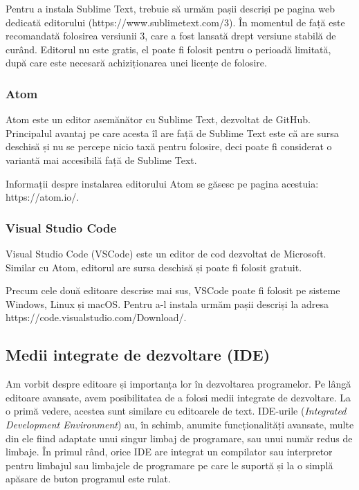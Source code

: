 Pentru a instala Sublime Text, trebuie să urmăm pașii descriși pe pagina web
dedicată editorului (https://www.sublimetext.com/3). În momentul de față este
recomandată folosirea versiunii 3, care a fost lansată drept versiune stabilă de
curând. Editorul nu este gratis, el poate fi folosit pentru o perioadă limitată,
după care este necesară achiziționarea unei licențe de folosire.

\subsubsection{Atom}
\label{sec:appdev:dev:editor-gui:atom}

Atom este un editor asemănător cu Sublime Text, dezvoltat de GitHub. Principalul
avantaj pe care acesta îl are față de Sublime Text este că are sursa deschisă și
nu se percepe nicio taxă pentru folosire, deci poate fi considerat o variantă
mai accesibilă față de Sublime Text.

Informații despre instalarea editorului Atom se găsesc pe pagina acestuia:
https://atom.io/.

\subsubsection{Visual Studio Code}
\label{sec:appdev:dev:editor-gui:vscode}

Visual Studio Code (VSCode) este un editor de cod dezvoltat de Microsoft.
Similar cu Atom, editorul are sursa deschisă și poate fi folosit gratuit.

Precum cele două editoare descrise mai sus, VSCode poate fi folosit pe sisteme
Windows, Linux și macOS. Pentru a-l instala urmăm pașii descriși la
adresa https://code.visualstudio.com/Download/.

\subsection{Medii integrate de dezvoltare (IDE)}
\label{sec:appdev:dev:ide}

Am vorbit despre editoare și importanța lor în dezvoltarea programelor. Pe lângă
editoare avansate, avem posibilitatea de a folosi medii integrate de dezvoltare.
La o primă vedere, acestea sunt similare cu editoarele de text. IDE-urile  (\textit{Integrated Development Environment}) au, în schimb, anumite
funcționalități avansate, multe din ele fiind adaptate unui singur limbaj de
programare, sau unui număr redus de limbaje. În primul rând, orice IDE are
integrat un compilator sau interpretor pentru limbajul sau limbajele de
programare pe care le suportă și la o simplă apăsare de buton programul este
rulat.

